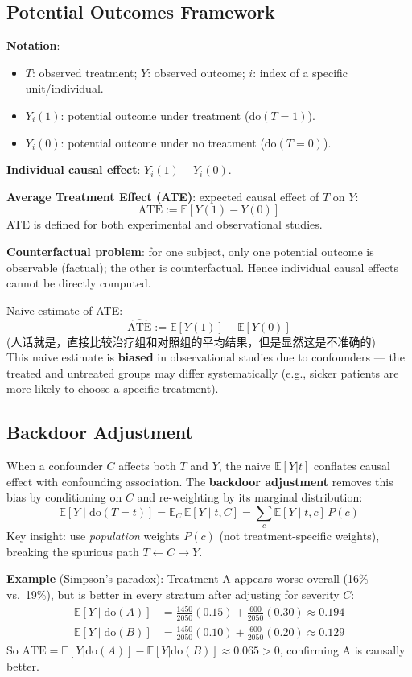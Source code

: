 \documentclass[UTF8]{ctexart}
\begin{document}
\subsection{Potential Outcomes Framework}
\textbf{Notation}:
\begin{itemize}
    \item $T$: observed treatment; $Y$: observed outcome; $i$: index of a specific unit/individual.
    \item $Y_i(1)$: potential outcome under treatment ($\text{do}(T=1)$).
    \item $Y_i(0)$: potential outcome under no treatment ($\text{do}(T=0)$).
\end{itemize}

\textbf{Individual causal effect}: $Y_i(1) - Y_i(0)$.

\textbf{Average Treatment Effect (ATE)}: expected causal effect of $T$ on $Y$:
\[
    \text{ATE} := \mathbb{E}[Y(1) - Y(0)]
\]
ATE is defined for both experimental and observational studies.

\textbf{Counterfactual problem}: for one subject, only one potential outcome is observable (factual); the other is counterfactual. Hence individual causal effects cannot be directly computed.

Naive estimate of ATE:
\[
    \widehat{\text{ATE}} := \mathbb{E}[Y(1)] - \mathbb{E}[Y(0)]
\]
(人话就是，直接比较治疗组和对照组的平均结果，但是显然这是不准确的) \\
This naive estimate is \textbf{biased} in observational studies due to confounders — the treated and untreated groups may differ systematically (e.g., sicker patients are more likely to choose a specific treatment).

\subsection{Backdoor Adjustment}

When a confounder $C$ affects both $T$ and $Y$, the naive $\mathbb{E}[Y|t]$ conflates causal effect with confounding association. The \textbf{backdoor adjustment} removes this bias by conditioning on $C$ and re-weighting by its marginal distribution:
\[
    \mathbb{E}[Y \mid \mathrm{do}(T=t)] = \mathbb{E}_C\,\mathbb{E}[Y \mid t, C] = \sum_c \mathbb{E}[Y \mid t, c]\, P(c)
\]
Key insight: use \emph{population} weights $P(c)$ (not treatment-specific weights), breaking the spurious path $T \leftarrow C \rightarrow Y$.

\textbf{Example} (Simpson's paradox): Treatment A appears worse overall (16\% vs.\ 19\%), but is better in every stratum after adjusting for severity $C$:
\begin{align*}
    \mathbb{E}[Y \mid \mathrm{do}(A)] &= \tfrac{1450}{2050}(0.15) + \tfrac{600}{2050}(0.30) \approx 0.194 \\
    \mathbb{E}[Y \mid \mathrm{do}(B)] &= \tfrac{1450}{2050}(0.10) + \tfrac{600}{2050}(0.20) \approx 0.129
\end{align*}
So $\text{ATE} = \mathbb{E}[Y|\mathrm{do}(A)] - \mathbb{E}[Y|\mathrm{do}(B)] \approx 0.065 > 0$, confirming A is causally better.
\end{document}
